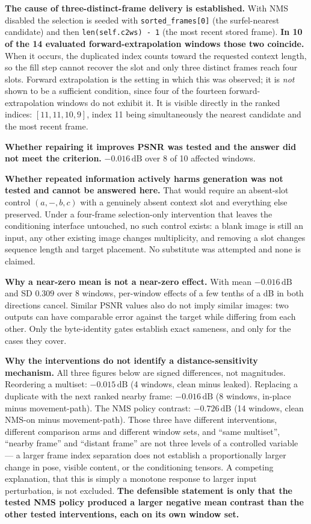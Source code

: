 \documentclass[11pt,a4paper]{article}
\newcommand{\code}[1]{\texttt{\small #1}}
\newcommand{\dB}{\,\mathrm{dB}}
\begin{document}
\textbf{The cause of three-distinct-frame delivery is established.} With NMS disabled the selection
is seeded with \code{sorted\_frames[0]} (the surfel-nearest candidate) and then
\code{len(self.c2ws) - 1} (the most recent stored frame). \textbf{In 10 of the 14 evaluated
forward-extrapolation windows those two coincide.} When it occurs, the duplicated index counts
toward the requested context length, so the fill step cannot recover the slot and only three
distinct frames reach four slots. Forward extrapolation is the setting in which this was observed;
it is \emph{not} shown to be a sufficient condition, since four of the fourteen
forward-extrapolation windows do not exhibit it. It is visible directly in the ranked indices:
$[11,11,10,9]$, index 11 being simultaneously the nearest candidate and the most recent frame.

\textbf{Whether repairing it improves PSNR was tested and the answer did not meet the criterion.}
$-0.016\dB$ over 8 of 10 affected windows.

\textbf{Whether repeated information actively harms generation was not tested and cannot be answered
here.} That would require an absent-slot control $(a,-,b,c)$ with a genuinely absent context slot and
everything else preserved. Under a four-frame selection-only intervention that leaves the
conditioning interface untouched, no such control exists: a blank image is still an input, any other
existing image changes multiplicity, and removing a slot changes sequence length and target
placement. No substitute was attempted and none is claimed.

\textbf{Why a near-zero mean is not a near-zero effect.} With mean $-0.016\dB$ and SD $0.309$ over 8
windows, per-window effects of a few tenths of a dB in both directions cancel. Similar PSNR values
also do not imply similar images: two outputs can have comparable error against the target while
differing from each other. Only the byte-identity gates establish exact sameness, and only for the
cases they cover.

\textbf{Why the interventions do not identify a distance-sensitivity mechanism.} All three figures
below are signed differences, not magnitudes. Reordering a multiset: $-0.015\dB$ (4 windows, clean
minus leaked). Replacing a duplicate with the next ranked nearby frame: $-0.016\dB$ (8 windows,
in-place minus movement-path). The NMS policy contrast: $-0.726\dB$ (14 windows, clean NMS-on minus
movement-path). Those three have different interventions, different comparison arms and different
window sets, and ``same multiset'', ``nearby frame'' and ``distant frame'' are not three levels of a
controlled variable --- a larger frame index separation does not establish a proportionally larger
change in pose, visible content, or the conditioning tensors. A competing explanation, that this is
simply a monotone response to larger input perturbation, is not excluded. \textbf{The defensible
statement is only that the tested NMS policy produced a larger negative mean contrast than the other
tested interventions, each on its own window set.}
\end{document}
